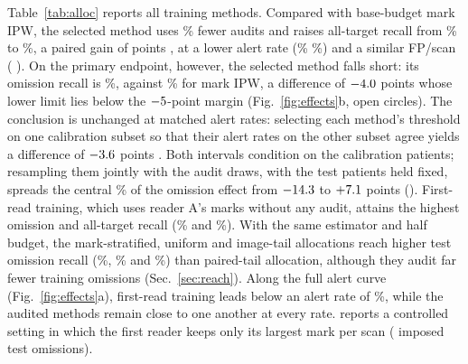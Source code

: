 \begin{table}[t]
\centering
\small
\setlength{\tabcolsep}{3.4pt}
\caption{Locked results under the C/D reference at nominal $\alpha=\AlphaNom$, mean of six matched draws. Omit.: recall on \NOmitTest{} test omissions (\%); All: recall on \NTargetTest{} targets (\%); Alert: alerted among the \PTest{} C/D-negative test patients (\%). Half and base are audit budgets; disc.: discriminative augmentation (Eq.~\ref{eq:augmentation}); weighted: tail-weighted objective (). The selected method is in bold.}
\label{tab:alloc}

\end{table}

Table~\ref{tab:alloc} reports all training methods. Compared with base-budget mark IPW, the selected method uses \AuditSave\% fewer audits and raises all-target recall from \AllIpw\% to \AllPair\%, a paired gain of \AllGain{} points \AllGainCI{}, at a lower alert rate (\AlertPair\% \vs \AlertIpw\%) and a similar FP/scan (\FPPair{} \vs \FPIpw{}). On the primary endpoint, however, the selected method falls short: its omission recall is \PairPrimary\%, against \IpwPrimary\% for mark IPW, a difference of $-4.0$ points \PairRelativePCI{} whose lower limit lies below the $-5$-point margin (Fig.~\ref{fig:effects}b, open circles). The conclusion is unchanged at matched alert rates: selecting each method's threshold on one calibration subset so that their alert rates on the other subset agree yields a difference of $-3.6$ points \MatchedDiffCI{}. Both intervals condition on the calibration patients; resampling them jointly with the audit draws, with the test patients held fixed, spreads the central \CILevel\% of the omission effect from $-14.3$ to $+7.1$ points (). First-read training, which uses reader A's marks without any audit, attains the highest omission and all-target recall (\OmitFirst\% and \AllFirst\%). With the same estimator and half budget, the mark-stratified, uniform and image-tail allocations reach higher test omission recall (\OmitMarkDisc\%, \OmitUniformDisc\% and \OmitImageDisc\%) than paired-tail allocation, although they audit far fewer training omissions (Sec.~\ref{sec:reach}). Along the full alert curve (Fig.~\ref{fig:effects}a), first-read training leads below an alert rate of \FirstLeadAlert\%, while the audited methods remain close to one another at every rate.  reports a controlled setting in which the first reader keeps only its largest mark per scan (\NOmitBookmark{} imposed test omissions).

